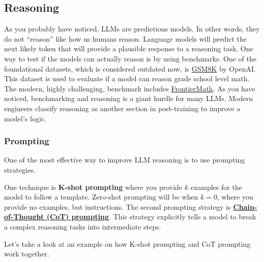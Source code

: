 \documentclass[../../main.tex]{subfiles}
\begin{document}
\subsection{Reasoning}

As you probably have noticed, LLMs are predictions models.
In other words, they do not ``reason'' like how us humans
reason. Language models will predict the next likely token
that will provide a plausible response to a reasoning task.
One way to test if the models can actually reason is by
using benchmarks. One of the foundational datasets, which
is considered outdated now, is
\href{https://huggingface.co/datasets/openai/gsm8k}{GSM8K}
by OpenAI. This dataset is used to evaluate if a model can
reason grade school level math. The modern, highly challenging,
benchmark includes \href{https://epoch.ai/frontiermath}{FrontierMath}.
As you have noticed, benchmarking and reasoning is a giant
hurdle for many LLMs. Modern engineers classify reasoning
as another section in post-training to improve a model's logic.

\subsubsection{Prompting}

One of the most effective way to improve LLM reasoning is
to use prompting strategies.

\begin{definition}{}{}
One technique is \textbf{K-shot prompting} where you provide
$k$ examples for the model to follow a template. Zero-shot
prompting will be when $k = 0$, where you provide no examples,
but instructions. The second prompting strategy is \textbf{
\href{https://arxiv.org/abs/2201.11903}{Chain-of-Thought (CoT)
prompting}}. This strategy explicitly tells a model to break
a complex reasoning tasks into intermediate steps. 
\end{definition}

\newpage

Let's take a look at an example on how K-shot prompting and
CoT prompting work together.
\end{document}
